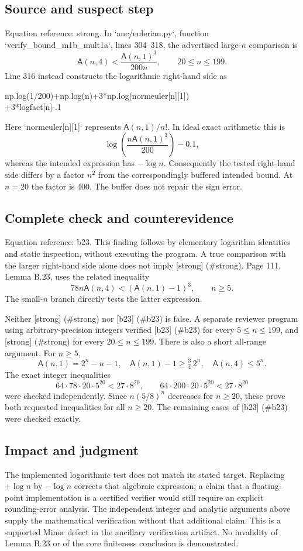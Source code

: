\documentclass[10pt]{article}
\begin{document}
\subsection*{Source and suspect step}
Equation reference: strong. In `anc/eulerian.py`, function `verify\_bound\_m1b\_mult1a`, lines 304–318, the advertised large-\(n\) comparison is \[
 \mathsf A(n,4)<\frac{\mathsf A(n,1)^3}{200n},\qquad 20\leq n\leq199.\] Line 316 instead constructs the logarithmic right-hand side as\par
{\ttfamily\footnotesize np.log(1/200)+np.log(n)+3*np.log(normeuler[n][1])\\
    +3*logfact[n]-.1}\par
Here `normeuler[n][1]` represents \(\mathsf A(n,1)/n!\). In ideal exact arithmetic this is \[\log\!\left(\frac{n\mathsf A(n,1)^3}{200}\right)-0.1,\] whereas the intended expression has \(-\log n\). Consequently the tested right-hand side differs by a factor \(n^2\) from the correspondingly buffered intended bound. At \(n=20\) the factor is 400. The buffer does not repair the sign error.\par
\subsection*{Complete check and counterevidence}
Equation reference: b23. This finding follows by elementary logarithm identities and static inspection, without executing the program. A true comparison with the larger right-hand side alone does not imply [strong] (\#strong). Page 111, Lemma B.23, uses the related inequality \[
 78n\mathsf A(n,4)<(\mathsf A(n,1)-1)^3,\qquad n\geq5.\] The small-\(n\) branch directly tests the latter expression.\par
Neither [strong] (\#strong) nor [b23] (\#b23) is false. A separate reviewer program using arbitrary-precision integers verified [b23] (\#b23) for every \(5\leq n\leq199\), and [strong] (\#strong) for every \(20\leq n\leq199\). There is also a short all-range argument. For \(n\geq5\), \[\mathsf A(n,1)=2^n-n-1,\quad
 \mathsf A(n,1)-1\geq \tfrac34\,2^n,\quad
 \mathsf A(n,4)\leq5^n.\] The exact integer inequalities \[64\cdot78\cdot20\cdot5^{20}<27\cdot8^{20},
 \qquad
 64\cdot200\cdot20\cdot5^{20}<27\cdot8^{20}\] were checked independently. Since \(n(5/8)^n\) decreases for \(n\geq20\), these prove both requested inequalities for all \(n\geq20\). The remaining cases of [b23] (\#b23) were checked exactly.\par
\subsection*{Impact and judgment}
The implemented logarithmic test does not match its stated target. Replacing \(+\log n\) by \(-\log n\) corrects that algebraic expression; a claim that a floating-point implementation is a certified verifier would still require an explicit rounding-error analysis. The independent integer and analytic arguments above supply the mathematical verification without that additional claim. This is a supported Minor defect in the ancillary verification artifact. No invalidity of Lemma B.23 or of the core finiteness conclusion is demonstrated.\par
\end{document}
